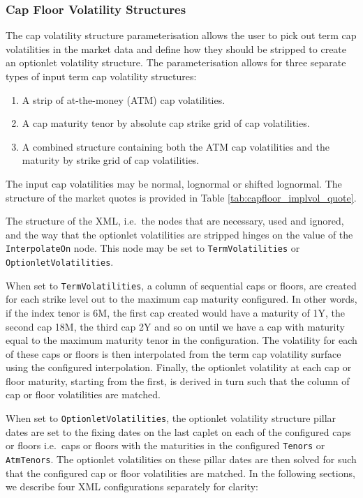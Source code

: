 \subsubsection{Cap Floor Volatility Structures}
\label{sss:capfloorconfig}

The cap volatility structure parameterisation allows the user to pick out term cap volatilities in the market data and define how they should be stripped to create an optionlet volatility structure. The parameterisation allows for three separate types of input term cap volatility structures:

\begin{enumerate}
\item A strip of at-the-money (ATM) cap volatilities.
\item A cap maturity tenor by absolute cap strike grid of cap volatilities.
\item A combined structure containing both the ATM cap volatilities and the maturity by strike grid of cap volatilities.
\end{enumerate}

The input cap volatilities may be normal, lognormal or shifted lognormal. The structure of the market quotes is provided in Table \ref{tab:capfloor_implvol_quote}.

The structure of the XML, i.e.\ the nodes that are necessary, used and ignored, and the way that the optionlet volatilities are stripped hinges on the value of the \lstinline!InterpolateOn! node. This node may be set to \lstinline!TermVolatilities! or \lstinline!OptionletVolatilities!.

When set to \lstinline!TermVolatilities!, a column of sequential caps or floors, are created for each strike level out to the maximum cap maturity configured. In other words, if the index tenor is 6M, the first cap created would have a maturity of 1Y, the second cap 18M, the third cap 2Y and so on until we have a cap with maturity equal to the maximum maturity tenor in the configuration. The volatility for each of these caps or floors is then interpolated from the term cap volatility surface using the configured interpolation. Finally, the optionlet volatility at each cap or floor maturity, starting from the first, is derived in turn such that the column of cap or floor volatilities are matched.

When set to \lstinline!OptionletVolatilities!, the optionlet volatility structure pillar dates are set to the fixing dates on the last caplet on each of the configured caps or floors i.e.\ caps or floors with the maturities in the configured \lstinline!Tenors! or \lstinline!AtmTenors!. The optionlet volatilities on these pillar dates are then solved for such that the configured cap or floor volatilities are matched. In the following sections, we describe four XML configurations separately for clarity:

